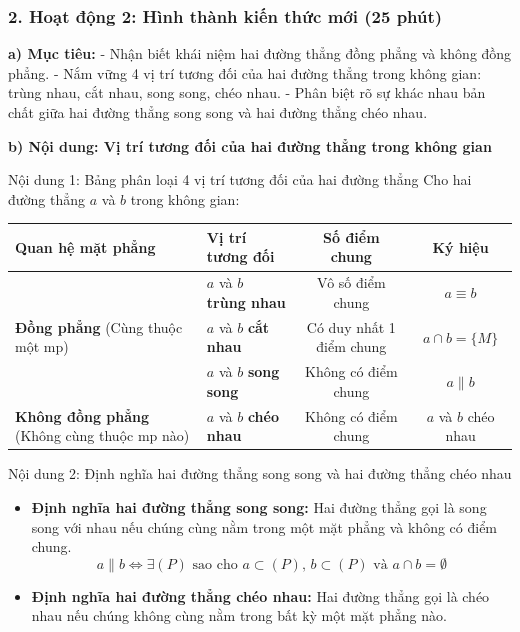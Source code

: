 \documentclass[12pt, a4paper]{article}
\begin{document}
\subsubsection*{2. Hoạt động 2: Hình thành kiến thức mới (25 phút)}

\noindent \textbf{a) Mục tiêu:}
- Nhận biết khái niệm hai đường thẳng đồng phẳng và không đồng phẳng.
- Nắm vững 4 vị trí tương đối của hai đường thẳng trong không gian: trùng nhau, cắt nhau, song song, chéo nhau.
- Phân biệt rõ sự khác nhau bản chất giữa hai đường thẳng song song và hai đường thẳng chéo nhau.

\noindent \textbf{b) Nội dung: Vị trí tương đối của hai đường thẳng trong không gian}
\begin{pedabox}{Nội dung 1: Bảng phân loại 4 vị trí tương đối của hai đường thẳng}
Cho hai đường thẳng $a$ và $b$ trong không gian:
\begin{center}
\small
\begin{tabularx}{\textwidth}{|p{3.5cm}|X|c|c|}
\hline
\textbf{Quan hệ mặt phẳng} & \textbf{Vị trí tương đối} & \textbf{Số điểm chung} & \textbf{Ký hiệu} \\ \hline
\multirow{3}{*}{\textbf{Đồng phẳng} \newline (Cùng thuộc một mp)} & $a$ và $b$ \textbf{trùng nhau} & Vô số điểm chung & $a \equiv b$ \\ \cline{2-4}
& $a$ và $b$ \textbf{cắt nhau} & Có duy nhất 1 điểm chung & $a \cap b = \{M\}$ \\ \cline{2-4}
& $a$ và $b$ \textbf{song song} & Không có điểm chung & $a \parallel b$ \\ \hline
\textbf{Không đồng phẳng} \newline (Không cùng thuộc mp nào) & $a$ và $b$ \textbf{chéo nhau} & Không có điểm chung & $a$ và $b$ chéo nhau \\ \hline
\end{tabularx}
\end{center}
\end{pedabox}

\begin{pedabox}{Nội dung 2: Định nghĩa hai đường thẳng song song và hai đường thẳng chéo nhau}
\begin{itemize}[leftmargin=0.6cm]
    \item \textbf{Định nghĩa hai đường thẳng song song:} Hai đường thẳng gọi là song song với nhau nếu chúng cùng nằm trong một mặt phẳng và không có điểm chung.
    $$a \parallel b \iff \exists (P) \text{ sao cho } a \subset (P), \, b \subset (P) \text{ và } a \cap b = \emptyset$$
    \item \textbf{Định nghĩa hai đường thẳng chéo nhau:} Hai đường thẳng gọi là chéo nhau nếu chúng không cùng nằm trong bất kỳ một mặt phẳng nào.
\end{itemize}
\end{pedabox}
\end{document}
